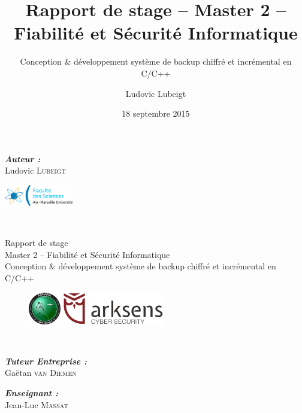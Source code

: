 \documentclass{beamer}
\title{Rapport de stage -- Master 2 -- Fiabilité et Sécurité Informatique}
\subtitle{Conception \&  développement système de backup chiffré et
incrémental en C/C++}
\author{Ludovic Lubeigt}
\institute{Aix-Marseille Université}
\date{18 septembre 2015}
\begin{document}
\begin{frame}
  \begin{minipage}{0.49\textwidth}
    \begin{flushleft}
      \emph{\bfseries Auteur :}\\
      Ludovic \textsc{Lubeigt}
    \end{flushleft}
  \end{minipage}
  \begin{minipage}{0.49\textwidth}
    \begin{flushright}
      \includegraphics[width=3cm]{logo_sciences.png}
    \end{flushright}
  \end{minipage}\\[2mm]

   
  \begin{beamerboxesrounded}[lower=arkblocklow, shadow=true]{}
    \centering\Large
    Rapport de stage\\ Master 2 -- Fiabilité et Sécurité Informatique\\
    Conception \& développement système de backup chiffré et incrémental en
    C/C++
  \end{beamerboxesrounded}
  
  \begin{figure}[H]
    \begin{minipage}[t]{0.49\textwidth}
      \centering
      \includegraphics[height=1.4cm]{logo_adhara.png}
    \end{minipage}
    \begin{minipage}[t]{0.49\textwidth}
      \centering
      \includegraphics[height=1.4cm]{logo_arksens.png}
    \end{minipage}\\[1mm]
  \end{figure}
    
  \begin{minipage}{0.49\textwidth}
    \begin{flushleft}
      \emph{\bfseries Tuteur Entreprise :}\\
      Gaëtan \textsc{van Diemen}
    \end{flushleft}
  \end{minipage}
  \begin{minipage}{0.49\textwidth}
    \begin{flushright}
      \emph{\bfseries Enseignant :}\\
      Jean-Luc \textsc{Massat}
    \end{flushright}
  \end{minipage}\\[1mm]
  

\end{frame}
\end{document}
